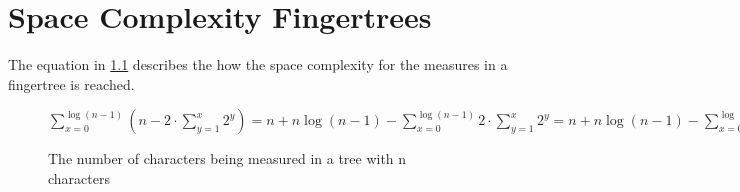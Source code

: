 \chapter{Space Complexity Fingertrees \label{chap:spacecomp}}
The equation in \cref{fig:bla} describes the how the space complexity for the
measures in a fingertree is reached.
\begin{figure}[!h]
\begin{center}
$\sum\limits_{x=0}^{\log (n-1)}(n- 2 \cdot \sum\limits_{y=1}^x2^y) =
n + n \log(n-1) - \sum\limits_{x=0}^{\log (n-1)} 2 \cdot \sum\limits_{y=1}^{x} 2^y=
n + n \log(n-1) - \sum\limits_{x=0}^{\log (n-1)} 2(2^{x+1} - 2) =
n + n \log(n-1) - \sum\limits_{x=0}^{\log (n-1)} (2^{x+2} - 4) =
n + n\log(n-1) + 4\log(n-1) + 4 - \sum\limits_{x=0}^{\log(n-1)} 2^{x+2} =
n + (n+4)\log(n-1) - 2^{\log(n-1)+3} +8 =
n + (n+4)\log(n-1) - 8(n-1) + 8=
(n+4)\log(n-1) - 7n + 16 \Rightarrow \Theta(n\log n)$
\end{center}
\caption{The number of characters being measured in a tree with n characters\label{fig:bla}}
\end{figure}
